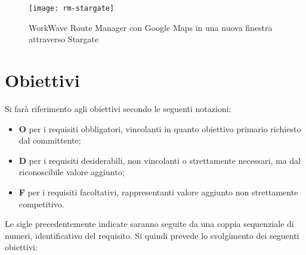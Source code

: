 \begin{figure}[H] 
    \centering 
    \texttt{[image: rm-stargate]} 
    \caption{WorkWave Route Manager con Google Maps in una nuova finestra attraverso Stargate}
\end{figure}
  
\section{Obiettivi}

Si farà riferimento agli obiettivi secondo le seguenti notazioni:

\begin{itemize}
    \item \textbf{O} per i requisiti obbligatori, vincolanti in quanto obiettivo primario richiesto dal committente;
    \item \textbf{D} per i requisiti desiderabili, non vincolanti o strettamente necessari, ma dal riconoscibile valore aggiunto;
    \item \textbf{F} per i requisiti facoltativi, rappresentanti valore aggiunto non strettamente competitivo.
\end{itemize}

Le sigle precedentemente indicate saranno seguite da una coppia sequenziale di numeri, identificativo del requisito. Si quindi prevede lo svolgimento dei seguenti obiettivi:


